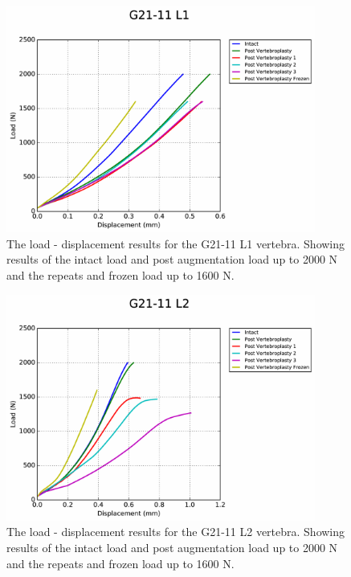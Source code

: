 \begin{figure}[ht]
\centering
\includegraphics[width=4in]{Chapters/Chapter_HT_images/G21-11_L1.pdf}
\caption{The load - displacement results for the G21-11 L1 vertebra. Showing results of the intact load and post augmentation load up to 2000 N and the repeats and frozen load up to 1600 N.}
\label{fig:G21-11_L1}
\end{figure}

\begin{figure}[ht]
\centering
\includegraphics[width=4in]{Chapters/Chapter_HT_images/G21-11_L2.pdf}
\caption{The load - displacement results for the G21-11 L2 vertebra. Showing results of the intact load and post augmentation load up to 2000 N and the repeats and frozen load up to 1600 N.}
\label{fig:G21-11_L2}
\end{figure}

